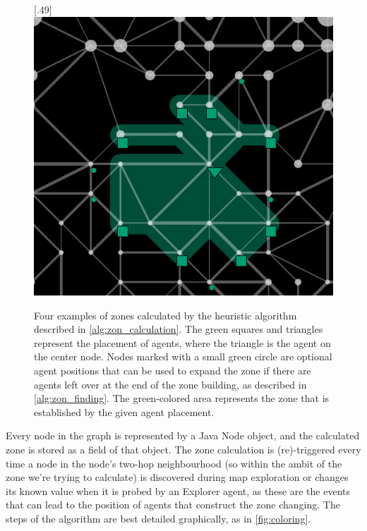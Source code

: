 \begin{figure}
  [.49\linewidth]{\includegraphics[width=.49\linewidth]{images/zone4.png}}
  \caption{Four examples of zones calculated by the heuristic algorithm described in \autoref{alg:zon_calculation}.
           The green squares and triangles represent the placement of agents, where the triangle is the agent on the center node.
           Nodes marked with a small green circle are optional agent positions that can be used to expand the zone if there are agents left over at the end of the zone building, as described in \autoref{alg:zon_finding}.
           The green-colored area represents the zone that is established by the given agent placement.}
  \label{fig:zones}
\end{figure}
Every node in the graph is represented by a Java Node object, and the calculated zone is stored as a field of that object.
The zone calculation is (re)-triggered every time a node in the node's two-hop neighbourhood (so within the ambit of the zone we're trying to calculate) is discovered during map exploration or changes its known value when it is probed by an Explorer agent, as these are the events that can lead to the position of agents that construct the zone changing.
The steps of the algorithm are best detailed graphically, as in \autoref{fig:coloring}.
